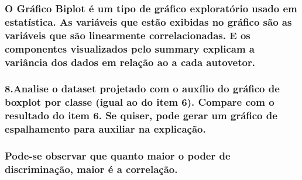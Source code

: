 \documentclass[
]{article}
\begin{document}
\hypertarget{o-gruxe1fico-biplot-uxe9-um-tipo-de-gruxe1fico-exploratuxf3rio-usado-em-estatuxedstica.-as-variuxe1veis-que-estuxe3o-exibidas-no-gruxe1fico-suxe3o-as-variuxe1veis-que-suxe3o-linearmente-correlacionadas.-e-os-componentes-visualizados-pelo-summary-explicam-a-variuxe2ncia-dos-dados-em-relauxe7uxe3o-ao-a-cada-autovetor.}{%
\subsubsection{O Gráfico Biplot é um tipo de gráfico exploratório usado
em estatística. As variáveis que estão exibidas no gráfico são as
variáveis que são linearmente correlacionadas. E os componentes
visualizados pelo summary explicam a variância dos dados em relação ao a
cada
autovetor.}\label{o-gruxe1fico-biplot-uxe9-um-tipo-de-gruxe1fico-exploratuxf3rio-usado-em-estatuxedstica.-as-variuxe1veis-que-estuxe3o-exibidas-no-gruxe1fico-suxe3o-as-variuxe1veis-que-suxe3o-linearmente-correlacionadas.-e-os-componentes-visualizados-pelo-summary-explicam-a-variuxe2ncia-dos-dados-em-relauxe7uxe3o-ao-a-cada-autovetor.}}

\hypertarget{analise-o-dataset-projetado-com-o-auxuxedlio-do-gruxe1fico-de-boxplot-por-classe-igual-ao-do-item-6.-compare-com-o-resultado-do-item-6.-se-quiser-pode-gerar-um-gruxe1fico-de-espalhamento-para-auxiliar-na-explicauxe7uxe3o.}{%
\subsubsection{8.Analise o dataset projetado com o auxílio do gráfico de
boxplot por classe (igual ao do item 6). Compare com o resultado do item
6. Se quiser, pode gerar um gráfico de espalhamento para auxiliar na
explicação.}\label{analise-o-dataset-projetado-com-o-auxuxedlio-do-gruxe1fico-de-boxplot-por-classe-igual-ao-do-item-6.-compare-com-o-resultado-do-item-6.-se-quiser-pode-gerar-um-gruxe1fico-de-espalhamento-para-auxiliar-na-explicauxe7uxe3o.}}

\hypertarget{pode-se-observar-que-quanto-maior-o-poder-de-discriminauxe7uxe3o-maior-uxe9-a-correlauxe7uxe3o.}{%
\subsubsection{Pode-se observar que quanto maior o poder de
discriminação, maior é a
correlação.}\label{pode-se-observar-que-quanto-maior-o-poder-de-discriminauxe7uxe3o-maior-uxe9-a-correlauxe7uxe3o.}}
\end{document}

